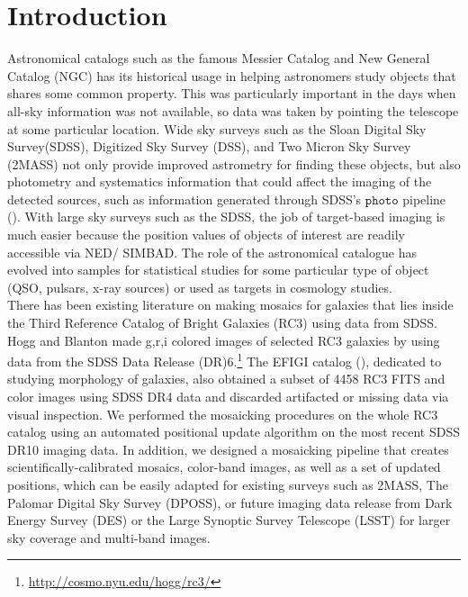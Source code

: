 \documentclass[5p]{elsarticle}
\begin{document}
\section{Introduction}
Astronomical catalogs such as the famous Messier Catalog and New General Catalog (NGC) has its historical usage in helping  astronomers  study objects that shares some common property. This was particularly important in the days when all-sky information was not available, so data was taken by pointing the telescope at some particular location.  
Wide sky surveys such as the Sloan Digital Sky Survey(SDSS), Digitized Sky Survey (DSS), and Two Micron Sky Survey (2MASS) not only provide improved astrometry for finding these objects, but also photometry and systematics information that could affect the imaging of the detected sources, such as information generated through SDSS's $\texttt{photo}$ pipeline (\citet{photopaper}).
With large sky surveys such as the SDSS, the job of target-based imaging is much  easier because the position values of objects of interest are readily accessible via NED/ SIMBAD. The role of the astronomical catalogue has evolved into samples for statistical studies for some particular type of object (QSO, pulsars, x-ray sources) or used as targets in cosmology studies.
\\
\indent
There has been existing literature on making mosaics for galaxies that lies inside the Third Reference Catalog of Bright Galaxies  (RC3) using data from SDSS. Hogg and Blanton made g,r,i colored images of selected RC3 galaxies by using data from the SDSS Data Release (DR)6.\footnote{\url{http://cosmo.nyu.edu/hogg/rc3/}} The EFIGI catalog (\citet{efigi}), dedicated to studying morphology of galaxies, also  obtained a subset of 4458 RC3 FITS and color images using SDSS DR4 data and discarded artifacted or missing data via visual inspection. We performed the mosaicking procedures on the whole RC3 catalog using an automated positional update algorithm on the most recent SDSS DR10 imaging data. In addition, we designed a mosaicking pipeline that creates scientifically-calibrated mosaics, color-band images, as well as a set of updated positions, which can be easily adapted for existing surveys such as 2MASS, The Palomar Digital Sky Survey (DPOSS), or future imaging data release from  Dark Energy Survey (DES) or the Large Synoptic Survey Telescope (LSST) for larger sky coverage and multi-band images.
\end{document}
